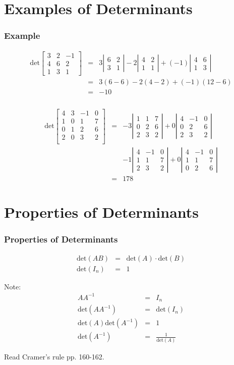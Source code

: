 \documentclass{beamer}
\newcommand{\detTwo}[4]{
  \left|
  \begin{array}{rr}
    #1 & #2 \\
    #3 & #4
  \end{array}
  \right|
}
\newcommand{\arrayThree}[9]{
  \left[
    \begin{array}{rrr}
      #1 & #2 & #3 \\
      #4 & #5 & #6 \\
      #7 & #8 & #9
    \end{array}
  \right]
}
\newcommand{\detThree}[9]{
  \left|
    \begin{array}{rrr}
      #1 & #2 & #3 \\
      #4 & #5 & #6 \\
      #7 & #8 & #9
    \end{array}
  \right|
}
\newcommand{\startRowFour}{
  \left[
    \begin{array}{rrrr}
}
\newcommand{\oneRowFour}[4] {
      #1 & #2 & #3 & #4 \\
}
\newcommand{\stopRowOps}{
    \end{array}
  \right]
}
\begin{document}
\section{Examples of Determinants}

\begin{frame}
  \frametitle{Example}

  \begin{eqnarray*}
    \mathrm{det}
    \arrayThree{3}{2}{-1}{4}{6}{2}{1}{3}{1}
    & = & 
    3\detTwo{6}{2}{3}{1} - 2 \detTwo{4}{2}{1}{1} 
    + (-1) \detTwo{4}{6}{1}{3} \\
    & = & 3 (6-6) - 2(4-2) + (-1) (12-6) \\
    & = & -10
  \end{eqnarray*}

\end{frame}


\begin{frame}
  \frametitle{}

  \begin{eqnarray*}
    \mathrm{det}
    \startRowFour
    \oneRowFour{4}{3}{-1}{0}
    \oneRowFour{1}{0}{1}{7}
    \oneRowFour{0}{1}{2}{6}
    \oneRowFour{2}{0}{3}{2}
    \stopRowOps
    & = & 
    -3 \detThree{1}{1}{7}{0}{2}{6}{2}{3}{2}
    + 0 \detThree{4}{-1}{0}{0}{2}{6}{2}{3}{2} \\
    & & 
    - 1 \detThree{4}{-1}{0}{1}{1}{7}{2}{3}{2}
    + 0 \detThree{4}{-1}{0}{1}{1}{7}{0}{2}{6} \\
    & = & 178
  \end{eqnarray*}


\end{frame}


\section{Properties of Determinants}

\begin{frame}
  \frametitle{Properties of Determinants}

  \begin{eqnarray*}
    \mathrm{det}(AB) & = & \mathrm{det}(A) \cdot \mathrm{det}(B) \\
    \mathrm{det}(I_n) & = & 1
  \end{eqnarray*}

  Note:
  \begin{eqnarray*}
    A A^{-1} & = & I_n \\
    \mathrm{det}(A A^{-1}) & = & \mathrm{det}(I_n) \\
    \mathrm{det}(A) \mathrm{det}(A^{-1}) & = & 1 \\
    \mathrm{det}(A^{-1}) & = & \frac{1}{\mathrm{det}(A)}
  \end{eqnarray*}

  Read Cramer's rule pp. 160-162.

\end{frame}
\end{document}
